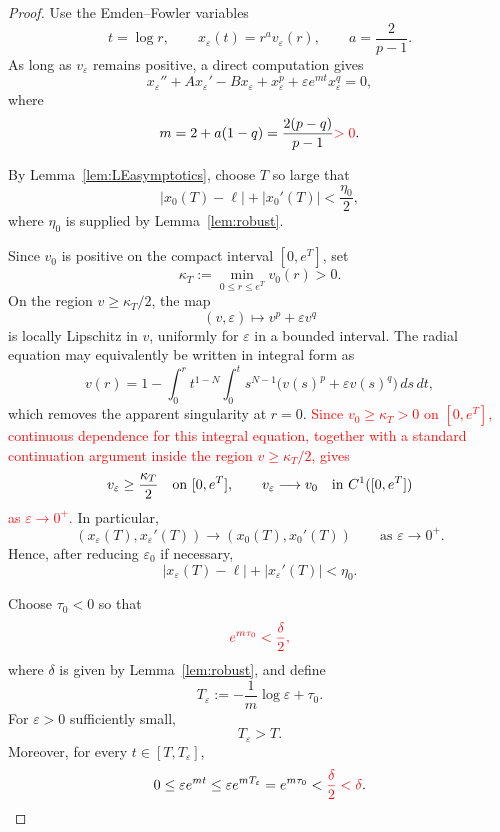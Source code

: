 \documentclass[11pt]{article}
\theoremstyle{definition}
\begin{document}
\begin{proof}
Use the Emden--Fowler variables
\[
t=\log r,
\qquad
x_\varepsilon(t)=r^av_\varepsilon(r),
\qquad
a=\frac2{p-1}.
\]
As long as $v_\varepsilon$ remains positive, a direct computation
gives
\begin{equation}
\label{eq:EFeps}
x_\varepsilon''
+Ax_\varepsilon'
-Bx_\varepsilon
+x_\varepsilon^p
+\varepsilon e^{mt}x_\varepsilon^q
=0,
\end{equation}
where
\begin{equation}
\label{eq:m}
m
=
2+a(1-q)
=
\frac{2(p-q)}{p-1}
\textcolor{red}{>0}.
\end{equation}

By Lemma~\ref{lem:LEasymptotics}, choose $T$ so large that
\[
|x_0(T)-\ell|+|x_0'(T)|
<
\frac{\eta_0}{2},
\]
where $\eta_0$ is supplied by Lemma~\ref{lem:robust}.

Since $v_0$ is positive on the compact interval $[0,e^T]$, set
\[
\kappa_T:=\min_{0\le r\le e^T}v_0(r)>0.
\]
On the region $v\ge \kappa_T/2$, the map
\[
(v,\varepsilon)\longmapsto v^p+\varepsilon v^q
\]
is locally Lipschitz in $v$, uniformly for $\varepsilon$ in a bounded
interval. The radial equation may equivalently be written in integral
form as
\[
v(r)=1-\int_0^r t^{1-N}\int_0^t
s^{N-1}\bigl(v(s)^p+\varepsilon v(s)^q\bigr)\,ds\,dt,
\]
which removes the apparent singularity at $r=0$.
\textcolor{red}{Since $v_0\geq\kappa_T>0$ on $[0,e^T]$, continuous
dependence for this integral equation, together with a standard
continuation argument inside the region
$v\geq\kappa_T/2$, gives}
\[
v_\varepsilon\ge \frac{\kappa_T}{2}
\quad\hbox{on }[0,e^T],
\qquad
v_\varepsilon\longrightarrow v_0
\quad\hbox{in }C^1([0,e^T])
\]
\textcolor{red}{as $\varepsilon\to0^+$.}
In particular,
\[
(x_\varepsilon(T),x_\varepsilon'(T))
\longrightarrow
(x_0(T),x_0'(T))
\qquad
\text{as }\varepsilon\to0^+.
\]
Hence, after reducing $\varepsilon_0$ if necessary,
\[
|x_\varepsilon(T)-\ell|
+
|x_\varepsilon'(T)|
<
\eta_0.
\]

Choose $\tau_0<0$ so that
\[
\textcolor{red}{
e^{m\tau_0}<\frac{\delta}{2},
}
\]
where $\delta$ is given by Lemma~\ref{lem:robust}, and define
\[
T_\varepsilon
:=
-\frac1m\log\varepsilon+\tau_0.
\]
For $\varepsilon>0$ sufficiently small,
\[
T_\varepsilon>T.
\]
Moreover, for every $t\in[T,T_\varepsilon]$,
\[
0\leq
\varepsilon e^{mt}
\leq
\varepsilon e^{mT_\varepsilon}
=
e^{m\tau_0}
<
\textcolor{red}{\frac{\delta}{2}<\delta}.
\]


\end{proof}
\end{document}
